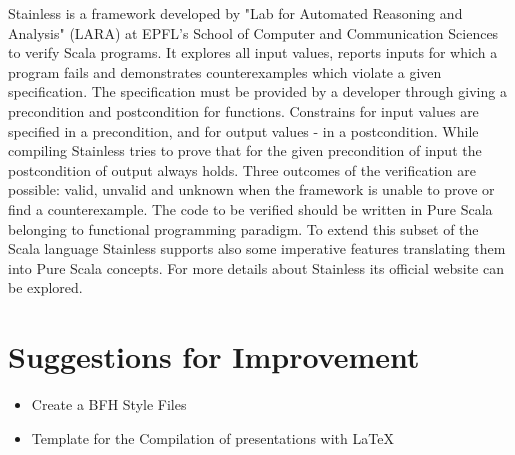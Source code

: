 Stainless is a framework developed by "Lab for Automated Reasoning and Analysis" (LARA) at EPFL's School of Computer and Communication Sciences to verify Scala programs.
It explores all input values, reports inputs for which a program fails and demonstrates counterexamples which violate a given specification.
The specification must be provided by a developer through giving a precondition and postcondition for functions. Constrains for input values are specified in a precondition, and for output values - in a postcondition. 
While compiling Stainless tries to prove that for the given precondition of input the postcondition of output always holds.
Three outcomes of the verification are possible: valid, unvalid and unknown when the framework is unable to prove or find a counterexample.
The code to be verified should be written in Pure Scala belonging to functional programming paradigm. To extend this subset of the Scala language Stainless supports also some imperative features translating them into Pure Scala concepts.
For more details about Stainless its official website can be explored. \cite{Stainless}



\section{Suggestions for Improvement}
\label{sec:introduction_suggestions}

\begin{itemize}
	\item Create a BFH Style Files
	\item Template for the Compilation of presentations with \LaTeX{}
\end{itemize}


